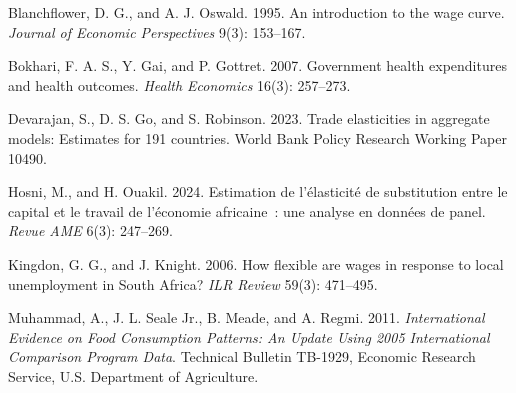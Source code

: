 
\begin{list}{}{\setlength{\leftmargin}{2em}\setlength{\itemindent}{-2em}%
  \setlength{\itemsep}{2pt}\setlength{\parsep}{0pt}}
\item Blanchflower, D. G., and A. J. Oswald. 1995. An introduction to the wage
curve. \textit{Journal of Economic Perspectives} 9(3): 153--167.
\item Bokhari, F. A. S., Y. Gai, and P. Gottret. 2007. Government health
expenditures and health outcomes. \textit{Health Economics} 16(3): 257--273.
\item Devarajan, S., D. S. Go, and S. Robinson. 2023. Trade elasticities in
aggregate models: Estimates for 191 countries. World Bank Policy Research
Working Paper 10490.
\item Hosni, M., and H. Ouakil. 2024. Estimation de l'\'elasticit\'e de
substitution entre le capital et le travail de l'\'economie africaine~: une
analyse en donn\'ees de panel. \textit{Revue AME} 6(3): 247--269.
\item Kingdon, G. G., and J. Knight. 2006. How flexible are wages in response
to local unemployment in South Africa? \textit{ILR Review} 59(3): 471--495.
\item Muhammad, A., J. L. Seale Jr., B. Meade, and A. Regmi. 2011.
\textit{International Evidence on Food Consumption Patterns: An Update Using
2005 International Comparison Program Data}. Technical Bulletin TB-1929,
Economic Research Service, U.S. Department of Agriculture.
\end{list}


\begin{alsosee}
\end{alsosee}
